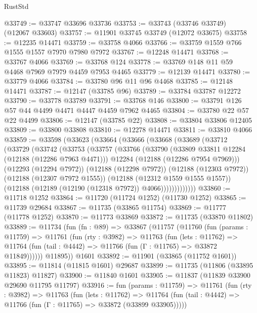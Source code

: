 \begin{lexlean}{RustStd}
\begin{coremodule}
@33749 := @33747 @33696 @33736
@33753 := @33743 (@33746 @33749) (@12067 @33603)
@33757 := @11901 @33745 @33749 (@12072 @33675)
@33758 := @12235 @14471
@33759 := @33758 @4066
@33766 := @33759 @1559 @766 @1555 @1557 @7970 @7980 @7972
@33767 := @12248 @14471
@33768 := @33767 @4066
@33769 := @33768 @124
@33778 := @33769 @148 @11 @59 @4468 @7969 @7979 @4459 @7953 @4465
@33779 := @12139 @14471
@33780 := @33779 @4066
@33784 := @33780 @96 @11 @96 @4468
@33785 := @12148 @14471
@33787 := @12147 (@33785 @96)
@33789 := @33784 @33787 @12272
@33790 := @33778 @33789
@33791 := @33768 @146
@33800 := @33791 @126 @57 @44 @4499 @4471 @4447 @4459 @7962 @4465
@33804 := @33780 @22 @57 @22 @4499
@33806 := @12147 (@33785 @22)
@33808 := @33804 @33806 @12405
@33809 := @33800 @33808
@33810 := @12278 @14471
@33811 := @33810 @4066
@33859 := @33598
    (@33623
      (@33664
        (@33666
          (@33668
            (@33689
              (@33712
                (@33729
                  (@33742
                    (@33753
                      (@33757
                        (@33766
                          (@33790
                            (@33809 @33811 @12284 (@12188 (@12286 @7963 @4471)))
                            @12284
                            (@12188 (@12286 @7954 @7969)))
                          (@12293 (@12294 @7972))
                          (@12188 (@12298 @7972))
                          (@12188 (@12303 @7972))
                          (@12188 (@12307 @7972 @1555))
                          (@12188 (@12312 @1559 @1555 @1557))
                          (@12188 (@12189 (@12190 (@12318 @7972)) @4066)))))))))))))
@33860 := @11718 @1252
@33864 := @11720 (@11724 @1252) (@11730 @1252)
@33865 := @11739 @29684
@33867 := @11735 (@33865 @11754)
@33869 := @11777 (@11778 @1252)
@33870 := @11773 @33869
@33872 := @11735 (@33870 @11802)
@33889 := @11734
    (fun (fn : @89) =>
    @33867
      (@11757
        (@11760
          (fun (params : @11759) =>
          @11761
            (fun (rty : @3982) =>
            @11763
              (fun (lets : @11762) =>
              @11764 (fun (tail : @4442) => @11766 (fun (Γ : @11765) => @33872 @11849))))))
        @11895))
    @1601
@33892 := @11901 (@33865 (@11752 @1601))
@33895 := @11814 (@11815 @1601) @29687
@33899 := @11735 (@11806 (@33895 @11823) @11827)
@33900 := @11840 @1601
@33905 := @11837 (@11839 @33900 @29690 @11795 @11797)
@33916 := fun (params : @11759) =>
  @11761
    (fun (rty : @3982) =>
    @11763
      (fun (lets : @11762) =>
      @11764 (fun (tail : @4442) => @11766 (fun (Γ : @11765) => @33872 (@33899 @33905)))))

\end{coremodule}
\end{lexlean}
